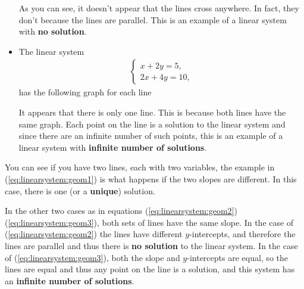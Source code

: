 \begin{itemize}
\begin{center}
\end{center}
As you can see, it doesn't appear that the lines cross anywhere.  In fact, they don't because the lines are parallel.  This is an example of a linear system with \textbf{no solution}. 


\item The linear system
%
\begin{align}
\begin{cases}
x + 2 y  = 5, \\
2x + 4 y = 10,
\end{cases} \label{eq:linearsystem:geom3}
\end{align}
%
has the following graph for each line
\begin{center}
\end{center}

It appears that there is only one line. This is because both lines have the same graph.  Each point on the line is a solution to the linear system and since there are an infinite number of such points, this is an example of a linear system with \textbf{infinite number of solutions}.  

\end{itemize}

You can see if you have two lines, each with two variables, the example in (\ref{eq:linearsystem:geom1}) is what happens if the two slopes are different.  In this case, there is one (or a \textbf{unique}) solution.  

In the other two cases as in equations (\ref{eq:linearsystem:geom2}) (\ref{eq:linearsystem:geom3}), both sets of lines have the same slope. In the case of (\ref{eq:linearsystem:geom2}) the lines have different $y$-intercepts, and therefore the lines are parallel and thus there is \textbf{no solution} to the linear system.  In the case of (\ref{eq:linearsystem:geom3}), both the slope and $y$-intercepts are equal, so the lines are equal and thus any point on the line is a solution, and this system has an \textbf{infinite number of solutions}.   


